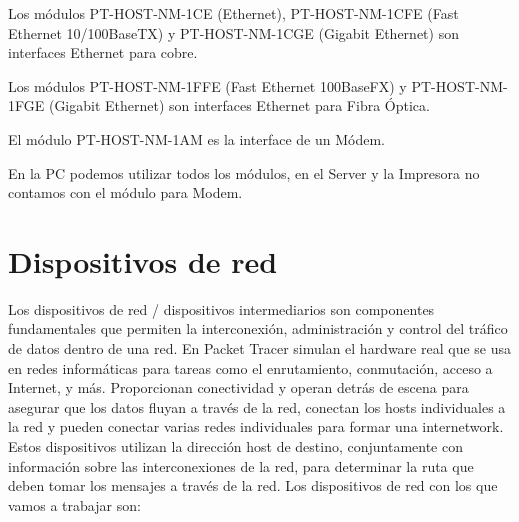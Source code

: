 \documentclass{article}
\begin{document}
Los módulos PT-HOST-NM-1CE (Ethernet), PT-HOST-NM-1CFE (Fast Ethernet 10/100BaseTX) y PT-HOST-NM-1CGE (Gigabit Ethernet) son interfaces Ethernet para cobre.

Los módulos PT-HOST-NM-1FFE (Fast Ethernet 100BaseFX) y PT-HOST-NM-1FGE (Gigabit Ethernet) son interfaces Ethernet para Fibra Óptica.

El módulo PT-HOST-NM-1AM es la interface de un Módem.

En la PC podemos utilizar todos los módulos, en el Server y la Impresora no contamos con el módulo para Modem.
\section{Dispositivos de red}
Los dispositivos de red / dispositivos intermediarios son componentes fundamentales que permiten la interconexión, administración y control del tráfico de datos dentro de una red. En Packet Tracer simulan el hardware real que se usa en redes informáticas para tareas como el enrutamiento, conmutación, acceso a Internet, y más. Proporcionan conectividad y operan detrás de escena para asegurar que los datos fluyan a través de la red, conectan los hosts individuales a la red y pueden conectar varias redes individuales para formar una internetwork. Estos dispositivos utilizan la dirección host de destino, conjuntamente con información sobre las interconexiones de la red, para determinar la ruta que deben tomar los mensajes a través de la red. Los dispositivos de red con los que vamos a trabajar son:
\end{document}
